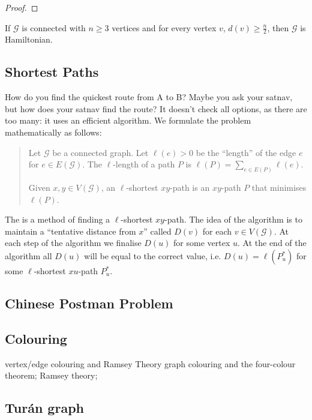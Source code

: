 \begin{proof}

\end{proof}

\begin{corollary}
If $\mathcal{G}$ is connected with $n\ge3$ vertices and for every vertex $v$, $d(v)\ge\frac{n}{2}$, then $\mathcal{G}$ is Hamiltonian.
\end{corollary}

\subsection{Shortest Paths}
How do you find the quickest route from A to B? Maybe you ask your satnav, but how does your satnav find the route? It doesn't check all options, as there are too many: it uses an efficient algorithm. We formulate the problem mathematically as follows:

\begin{quote}
Let $\mathcal{G}$ be a connected graph. Let $\ell(e)>0$ be the ``length'' of the edge $e$ for $e\in E(\mathcal{G})$. The $\ell$-length of a path $P$ is $\ell(P)=\sum_{e\in E(P)}\ell(e)$.

Given $x,y\in V(\mathcal{G})$, an $\ell$-shortest $xy$-path is an $xy$-path $P$ that minimises $\ell(P)$.
\end{quote}

The  is a method of finding a $\ell$-shortest $xy$-path. The idea of the algorithm is to maintain a ``tentative distance from $x$'' called $D(v)$ for each $v\in V(\mathcal{G})$. At each step of the algorithm we finalise $D(u)$ for some vertex $u$. At the end of the algorithm all $D(u)$ will be equal to the correct value, i.e. $D(u)=\ell(P_u^*)$ for some $\ell$-shortest $xu$-path $P_u^*$.

\subsection{Chinese Postman Problem}

\subsection{Colouring}
vertex/edge colouring and Ramsey Theory
graph colouring and the four-colour theorem; Ramsey theory; 

\subsection{Tur\'{a}n graph}


